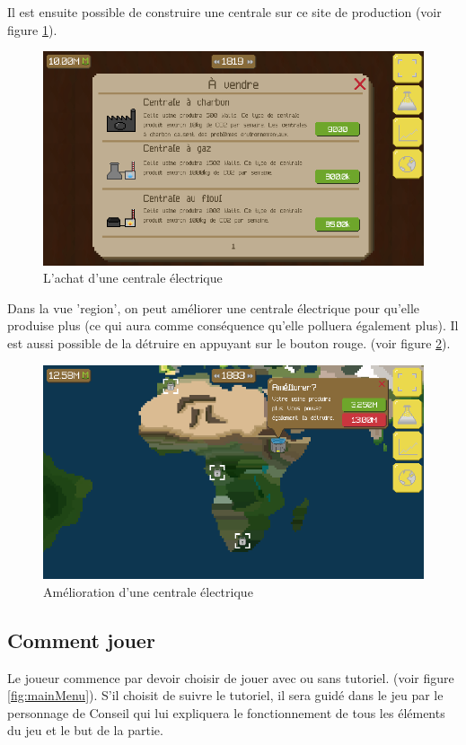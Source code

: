 \documentclass{article}
\begin{document}
        Il est ensuite possible de construire une centrale sur ce site de production (voir figure \ref{fig:buyPlant}).
        \begin{figure}[H]
                \includegraphics[width=\linewidth]{../images/buyPlant}
                \caption{L'achat d'une centrale électrique}
                \label{fig:buyPlant}
        \end{figure}
        
        
        Dans la vue 'region', on peut améliorer une centrale électrique pour qu'elle produise plus (ce qui aura comme conséquence qu'elle polluera également plus). Il est aussi possible de la détruire en appuyant sur le bouton rouge. (voir figure \ref{fig:upgradePlant}).
        \begin{figure}[H]
                \includegraphics[width=\linewidth]{../images/upgradePlant}
                \caption{Amélioration d'une centrale électrique}
                \label{fig:upgradePlant}
        \end{figure}
        
        
        \subsection{Comment jouer}
        Le joueur commence par devoir choisir de jouer avec ou sans tutoriel. (voir figure \ref{fig:mainMenu}).
        S'il choisit de suivre le tutoriel, il sera guidé dans le jeu par le personnage de Conseil qui lui expliquera le fonctionnement de tous les éléments du jeu et le but de la partie. 
        
\end{document}
